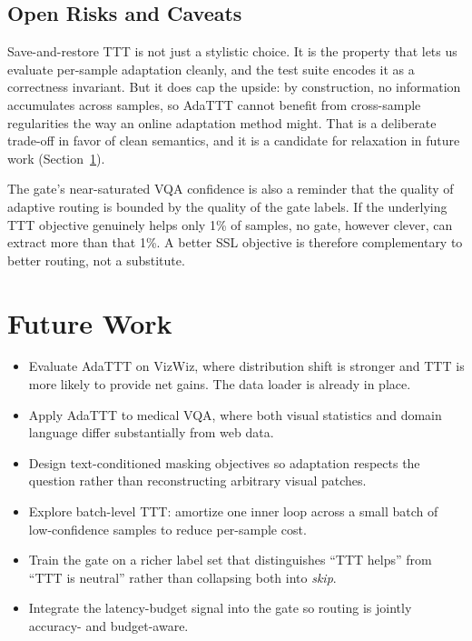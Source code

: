 \documentclass[conference]{IEEEtran}
\begin{document}
\subsection{Open Risks and Caveats}

Save-and-restore TTT is not just a stylistic choice. It is the property
that lets us evaluate per-sample adaptation cleanly, and the test suite
encodes it as a correctness invariant. But it does cap the upside: by
construction, no information accumulates across samples, so AdaTTT
cannot benefit from cross-sample regularities the way an online
adaptation method might. That is a deliberate trade-off in favor of
clean semantics, and it is a candidate for relaxation in future work
(Section~\ref{sec:future}).

The gate's near-saturated VQA confidence is also a reminder that the
quality of adaptive routing is bounded by the quality of the gate
labels. If the underlying TTT objective genuinely helps only 1\% of
samples, no gate, however clever, can extract more than that 1\%. A
better SSL objective is therefore complementary to better routing,
not a substitute.

\section{Future Work}
\label{sec:future}

\begin{itemize}
    \item Evaluate AdaTTT on VizWiz, where distribution shift is stronger
    and TTT is more likely to provide net gains. The data loader is
    already in place.
    \item Apply AdaTTT to medical VQA, where both visual statistics and
    domain language differ substantially from web data.
    \item Design text-conditioned masking objectives so adaptation
    respects the question rather than reconstructing arbitrary visual
    patches.
    \item Explore batch-level TTT: amortize one inner loop across a small
    batch of low-confidence samples to reduce per-sample cost.
    \item Train the gate on a richer label set that distinguishes ``TTT
    helps'' from ``TTT is neutral'' rather than collapsing both into
    \emph{skip}.
    \item Integrate the latency-budget signal into the gate so routing
    is jointly accuracy- and budget-aware.
\end{itemize}
\end{document}
